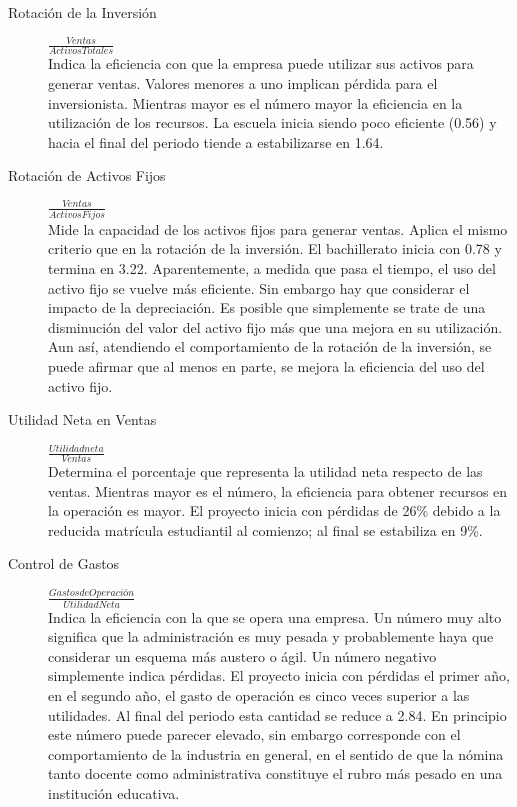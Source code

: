 \begin{description}
    \item[Rotación de la Inversión   ] $ \frac{Ventas}{Activos Totales}                          $ \hfill \\
    Indica la eficiencia con que la empresa puede utilizar sus activos para generar ventas. Valores menores a uno implican pérdida para el inversionista. Mientras mayor es el número mayor la eficiencia en la utilización de los recursos. La escuela inicia siendo poco eficiente (0.56) y hacia el final del periodo tiende a estabilizarse en 1.64.
    \item[Rotación de Activos Fijos  ] $ \frac{Ventas}{Activos Fijos}                            $ \hfill \\
    Mide la capacidad de los activos fijos para generar ventas. Aplica el mismo criterio que en la rotación de la inversión. El bachillerato inicia con 0.78 y termina en 3.22. Aparentemente, a medida que pasa el tiempo, el uso del activo fijo se vuelve más eficiente. Sin embargo hay que considerar el impacto de la depreciación. Es posible que simplemente se trate de una disminución del valor del activo fijo más que una mejora en su utilización. Aun así, atendiendo el comportamiento de la rotación de la inversión, se puede afirmar que al menos en parte, se mejora la eficiencia del uso del activo fijo.
    \item[Utilidad Neta en Ventas    ] $ \frac{Utilidad neta}{Ventas}                            $ \hfill \\
    Determina el porcentaje que representa la utilidad neta respecto de las ventas. Mientras mayor es el número, la eficiencia para obtener recursos en la operación es mayor. El proyecto inicia con pérdidas de 26\% debido a la reducida matrícula estudiantil al comienzo; al final se estabiliza en 9\%.
    \item[Control de Gastos          ] $ \frac{Gastos de Operación}{Utilidad Neta}               $ \hfill \\
    Indica la eficiencia con la que se opera una empresa. Un número muy alto significa que la administración es muy pesada y probablemente haya que considerar un esquema más austero o ágil. Un número negativo simplemente indica pérdidas. El proyecto inicia con pérdidas el primer año, en el segundo año, el gasto de operación es cinco veces superior a las utilidades. Al final del periodo esta cantidad se reduce a 2.84. En principio este número puede parecer elevado, sin embargo corresponde con el comportamiento de la industria en general, en el sentido de que la nómina tanto docente como administrativa constituye el rubro más pesado en una institución educativa.

\end{description}

